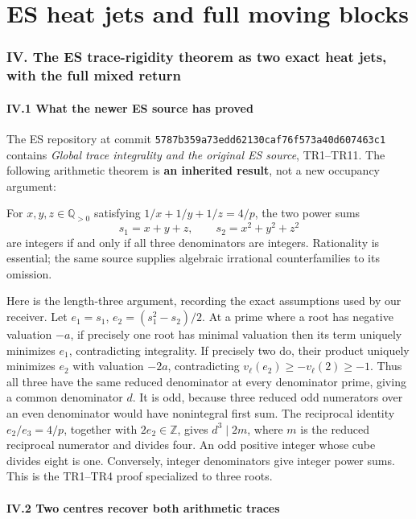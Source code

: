 \documentclass[11pt]{article}
\begin{document}
\clearpage\part{ES heat jets and full moving blocks}
\label{part:12}
\section{IV. The ES trace-rigidity theorem as two exact heat jets, with the full mixed return}\label{iv.-the-es-trace-rigidity-theorem-as-two-exact-heat-jets-with-the-full-mixed-return}

\subsection{IV.1 What the newer ES source has proved}\label{iv.1-what-the-newer-es-source-has-proved}

The ES repository at commit \nolinkurl{5787b359a73edd62130caf76f573a40d607463c1} contains \emph{Global trace integrality and the original ES source}, TR1--TR11. The following arithmetic theorem is \textbf{an inherited result}, not a new occupancy argument:

For \(x,y,z\in\mathbb Q_{>0}\) satisfying \(1/x+1/y+1/z=4/p\), the two power sums \[
 s_1=x+y+z,\qquad s_2=x^2+y^2+z^2
\] are integers if and only if all three denominators are integers. Rationality is essential; the same source supplies algebraic irrational counterfamilies to its omission.

Here is the length-three argument, recording the exact assumptions used by our receiver. Let \(e_1=s_1\), \(e_2=(s_1^2-s_2)/2\). At a prime where a root has negative valuation \(-a\), if precisely one root has minimal valuation then its term uniquely minimizes \(e_1\), contradicting integrality. If precisely two do, their product uniquely minimizes \(e_2\) with valuation \(-2a\), contradicting \(v_\ell(e_2)\ge-v_\ell(2)\ge-1\). Thus all three have the same reduced denominator at every denominator prime, giving a common denominator \(d\). It is odd, because three reduced odd numerators over an even denominator would have nonintegral first sum. The reciprocal identity \(e_2/e_3=4/p\), together with \(2e_2\in\mathbb Z\), gives \(d^3\mid2m\), where \(m\) is the reduced reciprocal numerator and divides four. An odd positive integer whose cube divides eight is one. Conversely, integer denominators give integer power sums. This is the TR1--TR4 proof specialized to three roots.

\subsection{IV.2 Two centres recover both arithmetic traces}\label{iv.2-two-centres-recover-both-arithmetic-traces}
\end{document}
